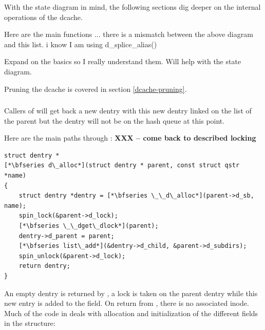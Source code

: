 With the state diagram in mind, the following sections dig deeper on the internal operations of the dcache.

Here are the main functions ... there is a mismatch between the above diagram and this list. i know I am using d\_splice\_alias()



Expand on the basics so I really understand them. Will help with the state diagram.

Pruning the dcache is covered in section \ref{dcache-pruning}.


\subsubsection{}

Callers of  will get back a new dentry with this new dentry linked on the  list of the parent but the dentry will not be on the hash queue at this point. 

Here are the main paths through : \textbf{XXX -- come back to described locking}

\begin{lstlisting}
struct dentry *
[*\bfseries d\_alloc*](struct dentry * parent, const struct qstr *name)
{   
    struct dentry *dentry = [*\bfseries \_\_d\_alloc*](parent->d_sb, name);
    spin_lock(&parent->d_lock);
    [*\bfseries \_\_dget\_dlock*](parent);
    dentry->d_parent = parent;
    [*\bfseries list\_add*](&dentry->d_child, &parent->d_subdirs);
    spin_unlock(&parent->d_lock);
    return dentry;
}   
\end{lstlisting}

\noindent
An empty dentry is returned by , a lock is taken on the parent dentry while this new entry is added to the  field. On return from , there is no associated inode. Much of the code in  deals with allocation and initialization of the different fields in the  structure:



